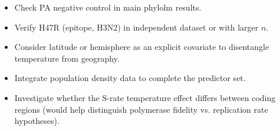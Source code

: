 \documentclass[11pt, a4paper]{article}
\begin{document}
\begin{itemize}
  \item Check PA negative control in main phylolm results.
  \item Verify H47R (epitope, H3N2) in independent dataset or with larger $n$.
  \item Consider latitude or hemisphere as an explicit covariate to
        disentangle temperature from geography.
  \item Integrate population density data to complete the predictor set.
  \item Investigate whether the S-rate temperature effect differs between
        coding regions (would help distinguish polymerase fidelity vs.
        replication rate hypotheses).
\end{itemize}
\end{document}
